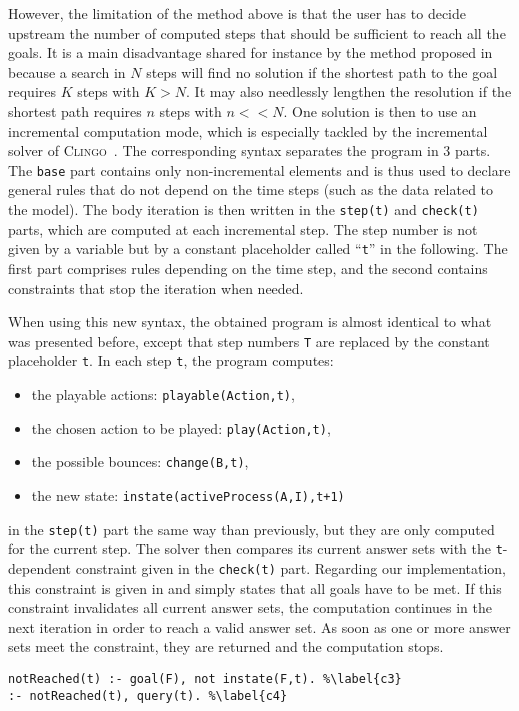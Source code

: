 
However, the limitation of the method above is that the user has to decide upstream
the number of computed steps that should be sufficient to reach all the goals.
It is a main disadvantage shared for instance by the method proposed in~\cite{roccaasp} because a search in $N$ steps will find no solution
if the shortest path to the goal requires $K$ steps with $K > N$.
It may also needlessly lengthen the resolution if the shortest path requires $n$ steps with $n << N$.
One solution is then to use an incremental computation mode,
which is especially tackled by the incremental solver of \textsc{Clingo}~\cite{gebser2008user}.
The corresponding syntax separates the program in 3 parts.
The \texttt{base} part contains only non-incremental elements
and is thus used to declare general rules
that do not depend on the time steps (such as the data related to the model).
The body iteration is then written in the
\texttt{step(t)} and \texttt{check(t)} parts,
which are computed at each incremental step. The step number is not given by a variable but by a constant placeholder called ``\texttt{t}'' in the following.
The first part comprises rules depending on the time step,
and the second contains constraints that stop the iteration when needed.

When using this new syntax, the obtained program is almost identical
to what was presented before,
except that step numbers \texttt{T}
are replaced by the constant placeholder \texttt{t}.
In each step \texttt{t}, the program computes:
\begin{itemize}\renewcommand{\labelitemi}{--}
  \item the playable actions: \texttt{playable(Action,t)},
  \item the chosen action to be played: \texttt{play(Action,t)},
  \item the possible bounces: \texttt{change(B,t)},
  \item the new state: \texttt{instate(activeProcess(A,I),t+1)}
\end{itemize}
in the \texttt{step(t)} part
the same way than previously,
but they are only computed for the current step.
The solver then compares its current answer sets with
the \texttt{t}-dependent constraint given in the \texttt{check(t)} part.
Regarding our implementation, this constraint is given in 
and simply states that all goals have to be met.
If this constraint invalidates all current answer sets,
the computation continues in the next iteration in order to reach a valid answer set.
As soon as one or more answer sets meet the constraint,
they are returned and the computation stops.
\begin{lstlisting}
notReached(t) :- goal(F), not instate(F,t). %\label{c3}
:- notReached(t), query(t). %\label{c4}
\end{lstlisting}
